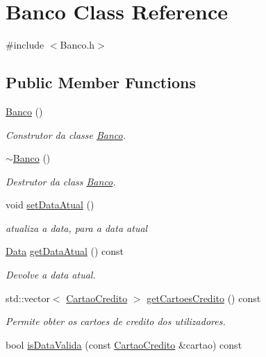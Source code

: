 \hypertarget{classBanco}{}\section{Banco Class Reference}
\label{classBanco}


{\ttfamily \#include $<$Banco.\+h$>$}

\subsection*{Public Member Functions}
\begin{DoxyCompactItemize}
\item 
\hyperlink{classBanco_a686e51b219dc175e432e91559298b259}{Banco} ()
\begin{DoxyCompactList}\small\item\em Construtor da classe \hyperlink{classBanco}{Banco}. \end{DoxyCompactList}\item 
\hyperlink{classBanco_af69f9b0da3521d7c1e422f21dfd5829e}{$\sim$\+Banco} ()
\begin{DoxyCompactList}\small\item\em Destrutor da class \hyperlink{classBanco}{Banco}. \end{DoxyCompactList}\item 
void \hyperlink{classBanco_a227af53b49995242c06d89bb10ffc8ea}{set\+Data\+Atual} ()
\begin{DoxyCompactList}\small\item\em atualiza a data, para a data atual \end{DoxyCompactList}\item 
\hyperlink{classData}{Data} \hyperlink{classBanco_a0735f07636c578666068a16f6ecccd91}{get\+Data\+Atual} () const
\begin{DoxyCompactList}\small\item\em Devolve a data atual. \end{DoxyCompactList}\item 
std\+::vector$<$ \hyperlink{classCartaoCredito}{Cartao\+Credito} $>$ \hyperlink{classBanco_a859463228f6bf63d32d70afe8efd9541}{get\+Cartoes\+Credito} () const
\begin{DoxyCompactList}\small\item\em Permite obter os cartoes de credito dos utilizadores. \end{DoxyCompactList}\item 
bool \hyperlink{classBanco_ac469cc9db5980081701bf9eb27a7e612}{is\+Data\+Valida} (const \hyperlink{classCartaoCredito}{Cartao\+Credito} \&cartao) const

\end{DoxyCompactItemize}
